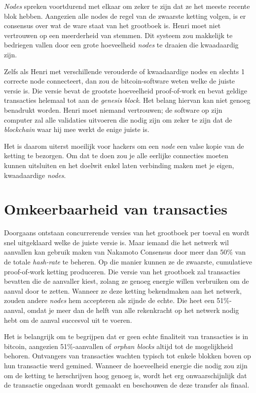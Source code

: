 \documentclass[smalldemyvopaper,11pt,twoside,onecolumn,openright,extrafontsizes]{memoir}
\begin{document}
\textit{Nodes} spreken voortdurend met elkaar om zeker te zijn dat ze het meeste recente blok hebben. Aangezien alle nodes de regel van de zwaarste ketting volgen, is er consensus over wat de ware staat van het grootboek is. Henri moet niet vertrouwen op een meerderheid van stemmen. Dit systeem zou makkelijk te bedriegen vallen door een grote hoeveelheid \textit{nodes} te draaien die kwaadaardig zijn.

Zelfs als Henri met verschillende verouderde of kwaadaardige nodes en slechts 1 correcte node connecteert, dan zou de bitcoin-software weten welke de juiste versie is. Die versie bevat de grootste hoeveelheid proof-of-work en bevat geldige transacties helemaal tot aan de \textit{genesis block}. Het belang hiervan kan niet genoeg benadrukt worden. Henri moet niemand vertrouwen; de software op zijn computer zal alle validaties uitvoeren die nodig zijn om zeker te zijn dat de \textit{blockchain} waar hij mee werkt de enige juiste is.

Het is daarom uiterst moeilijk voor hackers om een \textit{node} een valse kopie van de ketting te bezorgen. Om dat te doen zou je alle eerlijke connecties moeten kunnen uitsluiten en het doelwit enkel laten verbinding maken met je eigen, kwaadaardige \textit{nodes}.

\section{Omkeerbaarheid van transacties}
Doorgaans ontstaan concurrerende versies van het grootboek per toeval en wordt snel uitgeklaard welke de juiste versie is. Maar iemand die het netwerk wil aanvallen kan gebruik maken van Nakamoto Consensus door meer dan 50\% van de totale \textit{hash-rate} te beheren. Op die manier kunnen ze de zwaarste, cumulatieve proof-of-work ketting produceren. Die versie van het grootboek zal transacties bevatten die de aanvaller kiest, zolang ze genoeg energie willen verbruiken om de aanval door te zetten. Wanneer ze deze ketting bekendmaken aan het netwerk, zouden andere \textit{nodes} hem accepteren als zijnde de echte. Die heet een 51\%-aanval, omdat je meer dan de helft van alle rekenkracht op het netwerk nodig hebt om de aanval succesvol uit te voeren.

Het is belangrijk om te begrijpen dat er geen echte finaliteit van transacties is in bitcoin, aangezien 51\%-aanvallen of \textit{orphan blocks} altijd tot de mogelijkheid behoren. Ontvangers van transacties wachten typisch tot enkele blokken boven op hun transactie werd gemined. Wanneer de hoeveelheid energie die nodig zou zijn om de ketting te herschrijven hoog genoeg is, wordt het erg onwaarschijnlijk dat de transactie ongedaan wordt gemaakt en beschouwen de deze transfer als finaal.
\end{document}
